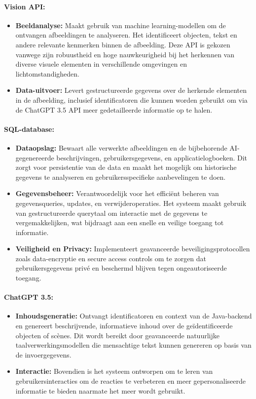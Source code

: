\paragraph{Vision API:}
\begin{itemize}
    \item \textbf{Beeldanalyse:} Maakt gebruik van machine learning-modellen om de ontvangen afbeeldingen te analyseren. Het identificeert objecten, tekst en andere relevante kenmerken binnen de afbeelding. Deze API is gekozen vanwege zijn robuustheid en hoge nauwkeurigheid bij het herkennen van diverse visuele elementen in verschillende omgevingen en lichtomstandigheden.
    \item \textbf{Data-uitvoer:} Levert gestructureerde gegevens over de herkende elementen in de afbeelding, inclusief identificatoren die kunnen worden gebruikt om via de ChatGPT 3.5 API meer gedetailleerde informatie op te halen.
\end{itemize}

\paragraph{SQL-database:}
\begin{itemize}
    \item \textbf{Dataopslag:} Bewaart alle verwerkte afbeeldingen en de bijbehorende AI-gegenereerde beschrijvingen, gebruikersgegevens, en applicatielogboeken. Dit zorgt voor persistentie van de data en maakt het mogelijk om historische gegevens te analyseren en gebruikersspecifieke aanbevelingen te doen.
    \item \textbf{Gegevensbeheer:} Verantwoordelijk voor het efficiënt beheren van gegevensqueries, updates, en verwijderoperaties. Het systeem maakt gebruik van gestructureerde querytaal om interactie met de gegevens te vergemakkelijken, wat bijdraagt aan een snelle en veilige toegang tot informatie.
    \item \textbf{Veiligheid en Privacy:} Implementeert geavanceerde beveiligingsprotocollen zoals data-encryptie en secure access controls om te zorgen dat gebruikersgegevens privé en beschermd blijven tegen ongeautoriseerde toegang.
\end{itemize}

\paragraph{ChatGPT 3.5:}
\begin{itemize}
    \item \textbf{Inhoudsgeneratie:} Ontvangt identificatoren en context van de Java-backend en genereert beschrijvende, informatieve inhoud over de geïdentificeerde objecten of scènes. Dit wordt bereikt door geavanceerde natuurlijke taalverwerkingsmodellen die mensachtige tekst kunnen genereren op basis van de invoergegevens.
    \item \textbf{Interactie:} Bovendien is het systeem ontworpen om te leren van gebruikersinteracties om de reacties te verbeteren en meer gepersonaliseerde informatie te bieden naarmate het meer wordt gebruikt.
\end{itemize}

